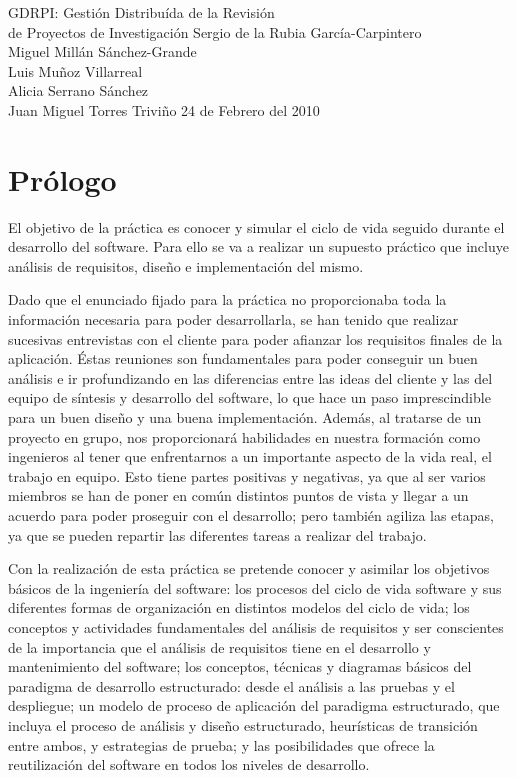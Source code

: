 \documentclass[12pt,a4paper,titlepage,spanish,twoside]{book}
\begin{document}
{GDRPI: Gestión Distribuída de la Revisión\\de Proyectos de Investigación}
{Sergio de la Rubia García-Carpintero\\Miguel Millán Sánchez-Grande\\Luis
  Muñoz Villarreal\\Alicia Serrano Sánchez\\Juan Miguel Torres Triviño}
{24 de Febrero del 2010}


\tableofcontents
\newpage

\listoffigures

\chapter*{Prólogo}
El objetivo de la práctica es conocer y simular el ciclo de vida seguido
durante el desarrollo del software. Para ello se va a realizar un supuesto
práctico que incluye análisis de requisitos, diseño e implementación del
mismo. 

Dado que el enunciado fijado para la práctica no proporcionaba toda la
información necesaria para poder desarrollarla, se han tenido que realizar
sucesivas entrevistas con el cliente para poder afianzar los requisitos finales
de la aplicación. Éstas reuniones son fundamentales para poder conseguir un
buen análisis e ir profundizando en las diferencias entre las ideas del
cliente y las del equipo de síntesis y desarrollo del software, lo que hace
un paso imprescindible para un buen diseño y una buena
implementación. Además, al tratarse de un proyecto en grupo, nos
proporcionará habilidades en nuestra formación como ingenieros al tener que
enfrentarnos a un importante aspecto de la vida real, el trabajo en
equipo. Esto tiene partes positivas y negativas, ya que al ser varios
miembros se han de poner en común distintos puntos de vista y llegar a un
acuerdo para poder proseguir con el desarrollo; pero también agiliza las
etapas, ya que se pueden repartir las diferentes tareas a realizar del
trabajo. 

Con la realización de esta práctica se pretende conocer y asimilar los
objetivos básicos de la ingeniería del software: los procesos del ciclo de
vida software y sus diferentes formas de organización en distintos modelos
del ciclo de vida; los conceptos y actividades fundamentales del análisis
de requisitos y ser conscientes de la importancia que el análisis de
requisitos tiene en el desarrollo y mantenimiento del software; los conceptos,
técnicas y diagramas básicos del paradigma de desarrollo estructurado: desde
el análisis a las pruebas y el despliegue; un modelo de proceso de aplicación
del paradigma estructurado, que incluya el proceso de análisis y diseño
estructurado, heurísticas de transición entre ambos, y estrategias de prueba;
y las posibilidades que ofrece la reutilización del software en todos los
niveles de desarrollo. 
\end{document}
